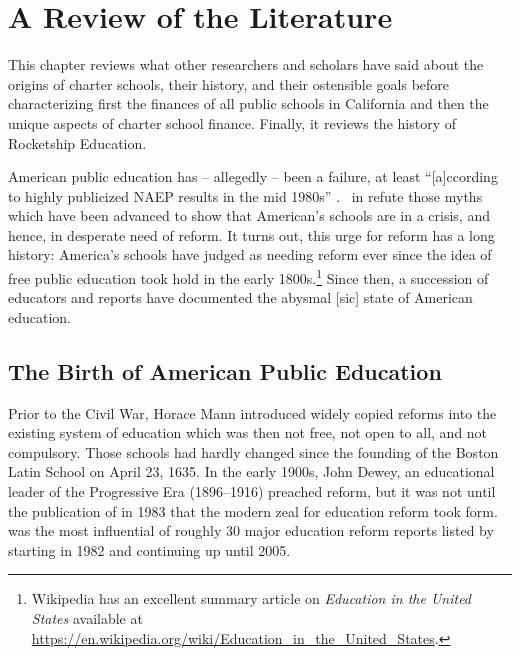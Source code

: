 
\chapter{A Review of the Literature}\label{ch:litreview}
\bigskip%
This chapter reviews what other researchers and scholars have said about the origins of charter schools, their history, and their ostensible goals before characterizing first the finances of all public schools in California and then the unique aspects of charter school finance. Finally, it reviews the history of Rocketship Education.

American public education has – allegedly – been a failure, at least ``[a]ccording to highly publicized NAEP results in the mid 1980s'' \parencite{Gove.Meier2000}. \textcite{Berliner.Glass2014} in  refute those myths which have been advanced to show that American's schools are in a crisis, and hence, in desperate need of reform. It turns out, this urge for reform has a long history: America's schools have judged as needing reform ever since the idea of free public education took hold in the early 1800s.\footnote{Wikipedia has an excellent summary article on \textit{Education in the United States} available at \url{https://en.wikipedia.org/wiki/Education_in_the_United_States}.} Since then, a succession of educators and reports have documented the abysmal [sic] state of American education.

\section{The Birth of American Public Education}\label{sec:birth-amer-publ}\indent

Prior to the Civil War, Horace Mann introduced widely copied reforms \parencite%
{Pulliam.VanPatten2007} into the existing system of education which was then not free, not open to all, and not compulsory. Those schools had hardly changed since the founding of the Boston Latin School on April 23, 1635. In the early 1900s, John Dewey, an educational leader of the Progressive Era (1896–1916) preached reform, but it was not until the publication of  in 1983 that the modern zeal for education reform took form.  was the most influential of roughly 30  major education reform reports listed by \textcite%
{Pulliam.VanPatten2007} starting in 1982 and continuing up until 2005.

